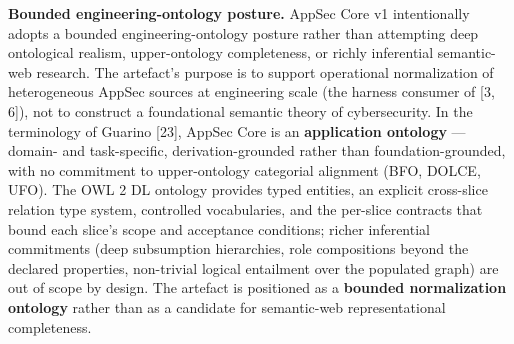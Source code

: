 \documentclass[
]{article}
\begin{document}
\textbf{Bounded engineering-ontology posture.} AppSec Core v1
intentionally adopts a bounded engineering-ontology posture rather than
attempting deep ontological realism, upper-ontology completeness, or
richly inferential semantic-web research. The artefact's purpose is to
support operational normalization of heterogeneous AppSec sources at
engineering scale (the harness consumer of {[}3, 6{]}), not to construct
a foundational semantic theory of cybersecurity. In the terminology of
Guarino {[}23{]}, AppSec Core is an \textbf{application ontology} ---
domain- and task-specific, derivation-grounded rather than
foundation-grounded, with no commitment to upper-ontology categorial
alignment (BFO, DOLCE, UFO). The OWL 2 DL ontology provides typed
entities, an explicit cross-slice relation type system, controlled
vocabularies, and the per-slice contracts that bound each slice's scope
and acceptance conditions; richer inferential commitments (deep
subsumption hierarchies, role compositions beyond the declared
properties, non-trivial logical entailment over the populated graph) are
out of scope by design. The artefact is positioned as a \textbf{bounded
normalization ontology} rather than as a candidate for semantic-web
representational completeness.
\end{document}
